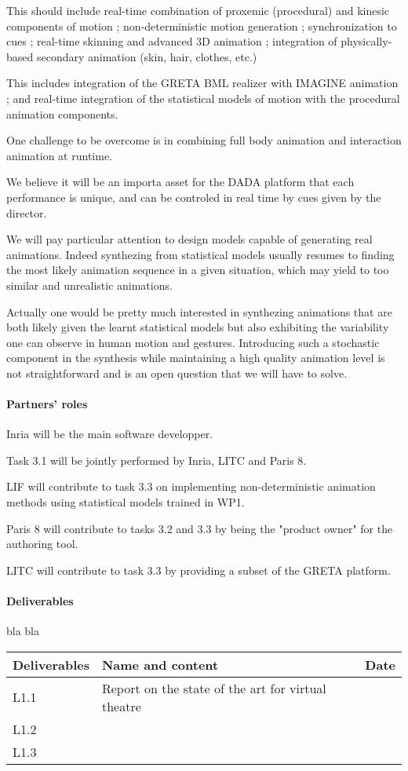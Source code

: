 This should include real-time combination of proxemic (procedural) and kinesic components of motion ; non-deterministic motion generation ; synchronization to cues ; real-time skinning and advanced 3D animation ; integration of physically-based secondary animation (skin, hair, clothes, etc.)

This includes integration of the GRETA BML realizer with IMAGINE animation ; and real-time integration of the statistical models of motion with the procedural animation components.


One challenge to be overcome is in combining full 	body animation and interaction animation at runtime.

We believe it will be an importa asset for the DADA platform that each performance is unique,
and can be controled in real time by cues given by the director. 
  
We will pay particular attention to design models capable of generating real animations. Indeed synthezing from statistical models usually resumes to finding the most likely animation sequence in a given situation, which may yield to too similar and unrealistic animations. 

Actually one would be pretty much interested in synthezing animations that are both likely given the learnt statistical models but also exhibiting the variability one can observe in human motion and gestures. Introducing such a stochastic component in the synthesis while maintaining a high quality animation level is not 
straightforward and is an open question that we will have to solve.

\paragraph{Partners' roles}

Inria will be the main software developper.

Task 3.1 will be jointly performed by Inria, LITC and Paris 8.

LIF will contribute to task 3.3 on implementing non-deterministic animation 
methods using statistical models trained in WP1.

Paris 8 will contribute to tasks 3.2 and 3.3 by being the "product owner" for the authoring tool.

LITC will contribute to task   3.3 by providing a subset of the GRETA platform.





\paragraph{Deliverables}

bla bla

\begin{tabular}{|l|l|l|}\hline
Deliverables & Name and content  & Date  \\\hline
L1.1  & Report on the state of the art for virtual theatre & \\\hline
L1.2  &  & \\\hline
L1.3  &  & \\\hline
\end{tabular}


\endinput
